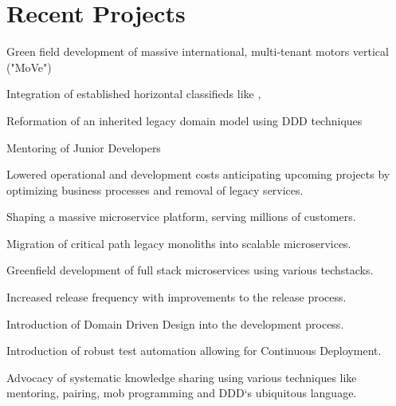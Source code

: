 \documentclass[]{resume}
\begin{document}
\begin{minipage}[t]{0.32\textwidth}
%
%

\end{minipage} 
\hfill
\begin{minipage}[t]{0.64\textwidth} 


\section{Recent Projects}

\vspace{\topsep} %
\begin{tightemize}
\item Green field development of massive international, multi-tenant motors vertical ("MoVe")
\item Integration of established horizontal classifieds like \href{https://www.kijiji.ca}{}, \href{https://www.gumtree.com.au}{}
\item Reformation of an inherited legacy domain model using DDD techniques
\item Mentoring of Junior Developers
\end{tightemize}
\sectionsep

\begin{tightemize}\item Lowered operational and development costs anticipating upcoming projects by optimizing business processes and removal of legacy services.
\end{tightemize}
\sectionsep

\begin{tightemize}
\item Shaping a massive microservice platform, serving millions of customers.
\item Migration of critical path legacy monoliths into scalable microservices.
\item Greenfield development of full stack microservices using various techstacks.
\item Increased release frequency with improvements to the release process.
\item Introduction of Domain Driven Design into the development process.
\item Introduction of robust test automation allowing for Continuous Deployment.
\item Advocacy of systematic knowledge sharing using various techniques like mentoring, pairing, mob programming and DDD`s ubiquitous language.
\end{tightemize}
\sectionsep


\end{minipage}
\end{document}
